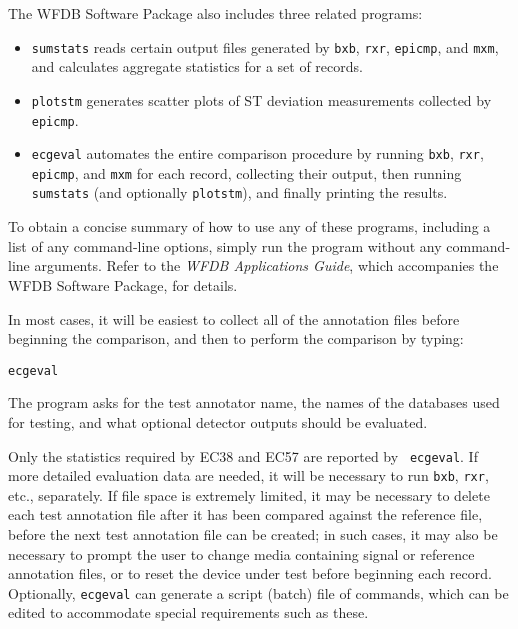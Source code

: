 \documentclass[twoside]{article}
\begin{document}
The WFDB Software Package also includes three related programs:
\begin{itemize}
   \item {\tt sumstats} reads certain output files generated by {\tt bxb},
{\tt rxr}, {\tt epicmp}, and {\tt mxm}, and calculates aggregate statistics for
a set of records.
   \item {\tt plotstm} generates scatter plots of ST deviation measurements
collected by {\tt epicmp}.
   \item {\tt ecgeval} automates the entire comparison procedure by running
{\tt bxb}, {\tt rxr}, {\tt epicmp}, and {\tt mxm} for each record, collecting
their output, then running {\tt sumstats} (and optionally {\tt plotstm}), and
finally printing the results.
\end{itemize}

To obtain a concise summary of how to use any of these programs, including
a list of any command-line options, simply run the program without any
command-line arguments.  Refer to the {\it WFDB Applications Guide},
which accompanies the WFDB Software Package, for details.

In most cases, it will be easiest to collect all of the annotation files
before beginning the comparison, and then to perform the comparison by typing:
\begin{verbatim}
ecgeval
\end{verbatim}
The program asks for the test annotator name, the names of the databases
used for testing, and what optional detector outputs should be evaluated.

Only the statistics required by EC38 and EC57 are reported by {\tt
ecgeval}.  If more detailed evaluation data are needed, it will be
necessary to run {\tt bxb}, {\tt rxr}, etc., separately.  If file
space is extremely limited, it may be necessary to delete each test
annotation file after it has been compared against the reference file,
before the next test annotation file can be created; in such cases, it
may also be necessary to prompt the user to change media containing
signal or reference annotation files, or to reset the device under
test before beginning each record.  Optionally, {\tt ecgeval} can
generate a script (batch) file of commands, which can be edited to
accommodate special requirements such as these.
\end{document}
